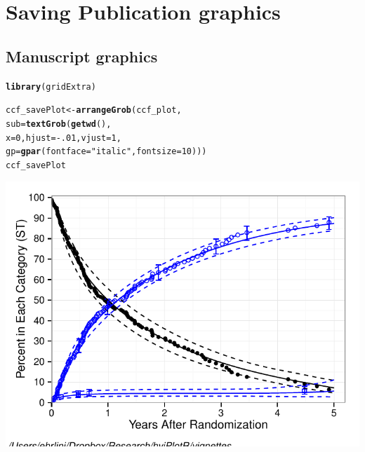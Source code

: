 \documentclass[nojss]{jss}\usepackage[]{graphicx}\usepackage[]{color}
\makeatletter
\def\maxwidth{ %
  \ifdim\Gin@nat@width>\linewidth
    \linewidth
  \else
    \Gin@nat@width
  \fi
}
\newcommand{\hlnum}[1]{\textcolor[rgb]{0.686,0.059,0.569}{#1}}%
\newcommand{\hlstr}[1]{\textcolor[rgb]{0.192,0.494,0.8}{#1}}%
\newcommand{\hlopt}[1]{\textcolor[rgb]{0,0,0}{#1}}%
\newcommand{\hlstd}[1]{\textcolor[rgb]{0.345,0.345,0.345}{#1}}%
\newcommand{\hlkwb}[1]{\textcolor[rgb]{0.69,0.353,0.396}{#1}}%
\newcommand{\hlkwc}[1]{\textcolor[rgb]{0.333,0.667,0.333}{#1}}%
\newcommand{\hlkwd}[1]{\textcolor[rgb]{0.737,0.353,0.396}{\textbf{#1}}}%
\newenvironment{kframe}{%
 \def\at@end@of@kframe{}%
 \ifinner\ifhmode%
  \def\at@end@of@kframe{\end{minipage}}%
  \begin{minipage}{\columnwidth}%
 \fi\fi%
 \def\FrameCommand##1{\hskip\@totalleftmargin \hskip-\fboxsep
 \colorbox{shadecolor}{##1}\hskip-\fboxsep
     \hskip-\linewidth \hskip-\@totalleftmargin \hskip\columnwidth}%
 \MakeFramed {\advance\hsize-\width
   \@totalleftmargin\z@ \linewidth\hsize
   \@setminipage}}%
 {\par\unskip\endMakeFramed%
 \at@end@of@kframe}
\newenvironment{knitrout}{}{} %
\makeatother
\begin{document}
\section{Saving Publication graphics}\label{S:saving}

\subsection{Manuscript graphics}



\begin{knitrout}\footnotesize
{}\color{fgcolor}\begin{kframe}
\begin{alltt}
\hlkwd{library}\hlstd{(gridExtra)}

\hlstd{ccf_savePlot} \hlkwb{<-} \hlkwd{arrangeGrob}\hlstd{(ccf_plot,}
                            \hlkwc{sub} \hlstd{=} \hlkwd{textGrob}\hlstd{(}\hlkwd{getwd}\hlstd{(),}
                                           \hlkwc{x} \hlstd{=} \hlnum{0}\hlstd{,} \hlkwc{hjust} \hlstd{=} \hlopt{-}\hlnum{.01}\hlstd{,} \hlkwc{vjust}\hlstd{=}\hlnum{1}\hlstd{,}
                                           \hlkwc{gp} \hlstd{=} \hlkwd{gpar}\hlstd{(}\hlkwc{fontface} \hlstd{=} \hlstr{"italic"}\hlstd{,} \hlkwc{fontsize} \hlstd{=} \hlnum{10}\hlstd{)))}
\hlstd{ccf_savePlot}
\end{alltt}
\end{kframe}

{\centering \includegraphics[width=\maxwidth]{figure/beamer-manuscriptFootnote} 

}



\end{knitrout}
\end{document}
